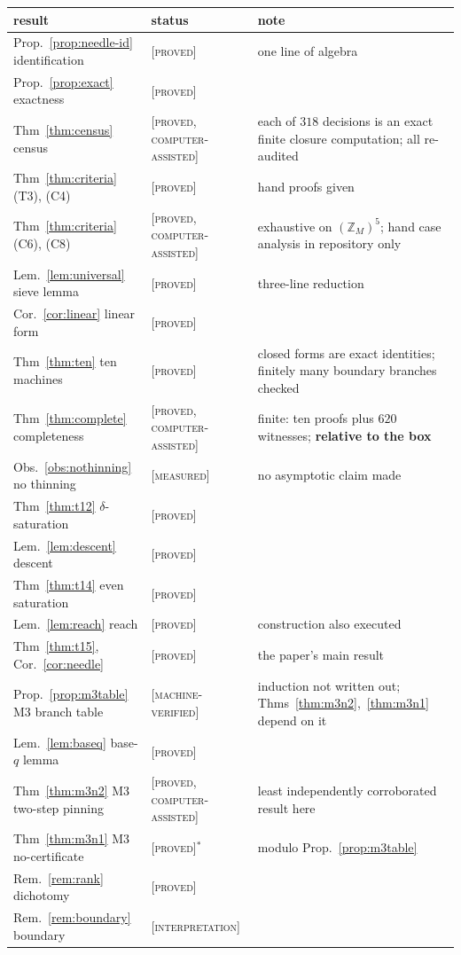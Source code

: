 \documentclass[11pt]{article}
\theoremstyle{definition}
\theoremstyle{remark}
\newcommand{\Z}{\mathbb{Z}}
\newcommand{\Proved}{\textsc{[proved]}}
\newcommand{\CAP}{\textsc{[proved, computer-assisted]}}
\newcommand{\MV}{\textsc{[machine-verified]}}
\newcommand{\Meas}{\textsc{[measured]}}
\newcommand{\Interp}{\textsc{[interpretation]}}
\begin{document}
\begin{center}
\small
\begin{tabular}{@{}llp{6.4cm}@{}}
\toprule
result & status & note \\
\midrule
Prop.~\ref{prop:needle-id} identification & \Proved & one line of algebra \\
Prop.~\ref{prop:exact} exactness & \Proved & \\
Thm~\ref{thm:census} census & \CAP & each of $318$ decisions is an exact finite
  closure computation; all re-audited \\
Thm~\ref{thm:criteria} (T3), (C4) & \Proved & hand proofs given \\
Thm~\ref{thm:criteria} (C6), (C8) & \CAP & exhaustive on $(\Z_M)^5$; hand case
  analysis in repository only \\
Lem.~\ref{lem:universal} sieve lemma & \Proved & three-line reduction \\
Cor.~\ref{cor:linear} linear form & \Proved & \\
Thm~\ref{thm:ten} ten machines & \Proved & closed forms are exact identities;
  finitely many boundary branches checked \\
Thm~\ref{thm:complete} completeness & \CAP & finite: ten proofs plus $620$
  witnesses; \textbf{relative to the box} \\
Obs.~\ref{obs:nothinning} no thinning & \Meas & no asymptotic claim made \\
Thm~\ref{thm:t12} $\delta$-saturation & \Proved & \\
Lem.~\ref{lem:descent} descent & \Proved & \\
Thm~\ref{thm:t14} even saturation & \Proved & \\
Lem.~\ref{lem:reach} reach & \Proved & construction also executed \\
Thm~\ref{thm:t15}, Cor.~\ref{cor:needle} & \Proved & the paper's main result \\
Prop.~\ref{prop:m3table} M3 branch table & \MV & induction not written out;
  Thms~\ref{thm:m3n2},~\ref{thm:m3n1} depend on it \\
Lem.~\ref{lem:baseq} base-$q$ lemma & \Proved & \\
Thm~\ref{thm:m3n2} M3 two-step pinning & \CAP & least independently
  corroborated result here \\
Thm~\ref{thm:m3n1} M3 no-certificate & \Proved$^{*}$ & modulo
  Prop.~\ref{prop:m3table} \\
Rem.~\ref{rem:rank} dichotomy & \Proved & \\
Rem.~\ref{rem:boundary} boundary & \Interp & \\

\end{tabular}
\end{center}
\end{document}
